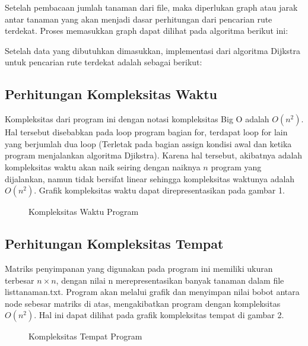 \documentclass[conference]{IEEEtran}
\begin{document}
\begin{figure}[htbp]
    \centering
    \scalebox{0.88}{}
\end{figure}
Setelah pembacaan jumlah tanaman dari file, maka diperlukan
graph atau jarak antar tanaman yang akan menjadi dasar
perhitungan dari pencarian rute terdekat. Proses memasukkan
graph dapat dilihat pada algoritma berikut ini:

\begin{figure}[htbp]
    \centering
    \scalebox{0.77}{}
\end{figure}
Setelah data yang dibutuhkan dimasukkan, implementasi
dari algoritma Dijkstra untuk pencarian rute terdekat adalah
sebagai berikut:

\begin{figure}[htbp]
    \centering
    \scalebox{1.17}{}
\end{figure}

\subsection{Perhitungan Kompleksitas Waktu}
Kompleksitas dari program ini dengan notasi kompleksitas
Big O adalah $O(n^2)$. Hal tersebut disebabkan pada loop
program bagian for, terdapat loop for lain yang berjumlah
dua loop (Terletak pada bagian assign kondisi awal dan ketika
program menjalankan algoritma Djikstra). Karena hal tersebut,
akibatnya adalah kompleksitas waktu akan naik seiring dengan
naiknya $n$ program yang dijalankan, namun tidak bersifat
linear sehingga kompleksitas waktunya adalah $O(n^2)$. Grafik
kompleksitas waktu dapat direpresentasikan pada gambar 1.

\begin{figure}[htbp]
    \centering
    \scalebox{0.35}{}
    \caption{Kompleksitas Waktu Program}
\end{figure}

\subsection{Perhitungan Kompleksitas Tempat}
Matriks penyimpanan yang digunakan pada program ini
memiliki ukuran terbesar $n\times n$, dengan nilai n merepresentasikan
banyak tanaman dalam file listtanaman.txt. Program
akan melalui grafik dan menyimpan nilai bobot antara node
sebesar matriks di atas, mengakibatkan program dengan kompleksitas
$O(n^2)$. Hal ini dapat dilihat pada grafik kompleksitas
tempat di gambar 2.
\begin{figure}[htbp]
    \centering
    \scalebox{0.35}{}
    \caption{Kompleksitas Tempat Program}
\end{figure}
\end{document}
